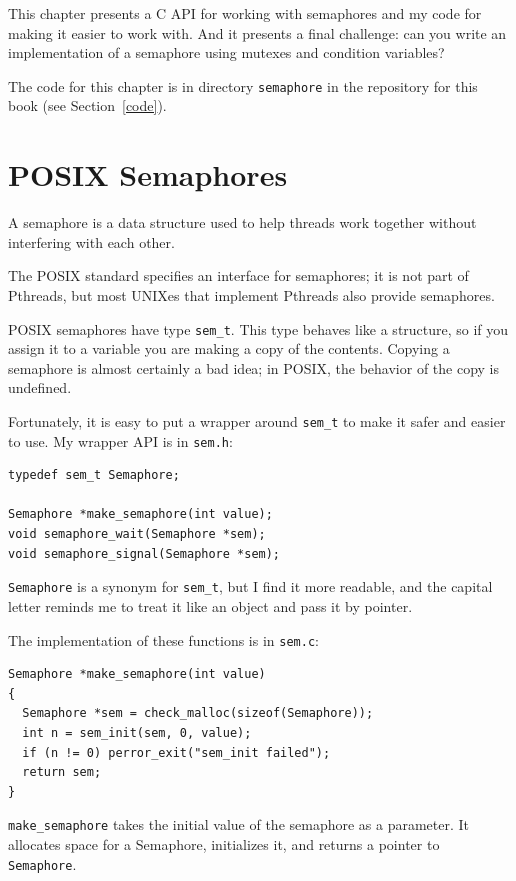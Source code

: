 \documentclass[12pt]{book}
\begin{document}
This chapter presents a C API for working with semaphores and
my code for making it easier to work with.  And it presents
a final challenge: can you write an implementation of a semaphore
using mutexes and condition variables?

The code for this chapter is in directory {\tt semaphore} in the
repository for this book (see Section~\ref{code}).


\section{POSIX Semaphores}

A semaphore is a data structure used to help threads work together
without interfering with each other.

The POSIX standard specifies an interface for semaphores;
it is not part of Pthreads, but most UNIXes
that implement Pthreads also provide semaphores.

POSIX semaphores have type {\tt sem\_t}.  
This type behaves like a structure, so
if you assign it to a variable you are making a copy of the
contents.  Copying a semaphore is almost certainly
a bad idea; in POSIX, the behavior of the copy is undefined.

Fortunately, it is easy to put a wrapper around {\tt sem\_t}
to make it safer and easier to use.  My wrapper API is in {\tt sem.h}:

\begin{verbatim}
typedef sem_t Semaphore;

Semaphore *make_semaphore(int value);
void semaphore_wait(Semaphore *sem);
void semaphore_signal(Semaphore *sem);
\end{verbatim}

{\tt Semaphore} is a synonym for \verb"sem_t", but I find it more
readable, and the capital letter reminds me to treat it like an
object and pass it by pointer.

The implementation of these functions is in {\tt sem.c}:

\begin{verbatim}
Semaphore *make_semaphore(int value)
{
  Semaphore *sem = check_malloc(sizeof(Semaphore));
  int n = sem_init(sem, 0, value);
  if (n != 0) perror_exit("sem_init failed");
  return sem;
}
\end{verbatim}

{\tt make\_semaphore} takes the initial value of the semaphore
as a parameter.  It allocates space for a Semaphore, initializes
it, and returns a pointer to {\tt Semaphore}.
\end{document}
